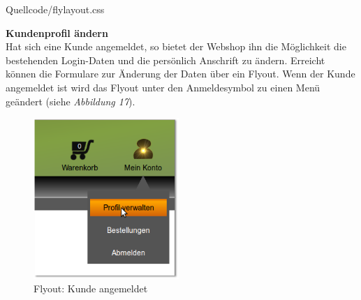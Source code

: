 \begin{center}
	\begin{lstinputlisting}[language=CSS, caption={Loginbereich: Umsetzung des Flyouts mit CSS 2.0}]
		{Quellcode/flylayout.css}
	\end{lstinputlisting}
\end{center}

\textbf{Kundenprofil ändern}\\
Hat sich eine Kunde angemeldet, so bietet der Webshop ihn die Möglichkeit die bestehenden Login-Daten und die persönlich Anschrift zu ändern. Erreicht können die Formulare zur Änderung der Daten über ein Flyout. Wenn der Kunde angemeldet ist wird das Flyout unter den Anmeldesymbol zu einen Menü geändert (siehe \textit{Abbildung 17}).
\begin{figure}[H]
	\begin{center}
			\includegraphics[width=55mm]{Bilder/Abbildung15_Menue_Profil_aendern.png}
	\end{center}
	\caption{Flyout: Kunde angemeldet}
\end{figure}


